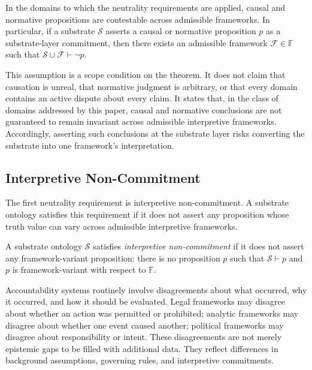 \begin{assumption}
\label{asm:contestability}
In the domains to which the neutrality requirements are applied,
causal and normative propositions are contestable across admissible frameworks.
In particular, if a substrate $\mathcal{S}$
asserts a causal or normative proposition $p$
as a substrate-layer commitment,
then there exists an admissible framework $\mathcal{F} \in \mathbb{F}$ such that
$\mathcal{S} \cup \mathcal{F} \vdash \neg p$.
\end{assumption}

This assumption is a scope condition on the theorem.
It does not claim that causation is unreal,
that normative judgment is arbitrary,
or that every domain contains an active dispute about every claim.
It states that, in the class of domains addressed by this paper,
causal and normative conclusions are not guaranteed to remain invariant
across admissible interpretive frameworks.
Accordingly, asserting such conclusions at the substrate layer
risks converting the substrate into one framework's interpretation.

\subsection{Interpretive Non-Commitment}
\label{subsec:interpretive-non-commitment}

The first neutrality requirement is interpretive non-commitment.
A substrate ontology satisfies this requirement
if it does not assert any proposition
whose truth value can vary across admissible interpretive frameworks.

\begin{definition}
\label{def:interpretive-non-commitment}
A substrate ontology $\mathcal{S}$ satisfies \emph{interpretive non-commitment}
if it does not assert any framework-variant proposition:
there is no proposition $p$ such that $\mathcal{S} \vdash p$
and $p$ is framework-variant with respect to $\mathbb{F}$.
\end{definition}

Accountability systems routinely involve disagreements
about what occurred, why it occurred, and how it should be evaluated.
Legal frameworks may disagree about whether an action was permitted or prohibited;
analytic frameworks may disagree about whether one event caused another;
political frameworks may disagree about responsibility or intent.
These disagreements are not merely epistemic gaps
to be filled with additional data.
They reflect differences in background assumptions,
governing rules, and interpretive commitments.

